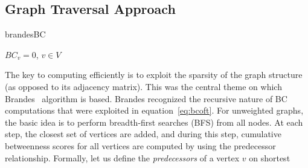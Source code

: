 %
%
\subsection{Graph Traversal Approach}
\label{subsec:graph_traversal}

\begin{algorithm}

\caption{brandesBC}
\label{alg:brandes}
$BC_v = 0$, $v\in{}V$\;

\end{algorithm}
%
The key to computing efficiently is to exploit the sparsity of the graph 
structure (as opposed to its adjacency matrix).
%
This was the central theme on which Brandes~\cite{brandes01:_mathsoc} algorithm
is based.
%
Brandes recognized the recursive nature of BC computations that were exploited
in equation~\ref{eq:bcoft}.
%
For unweighted graphs, the basic idea is to perform breadth-first searches
(BFS) from all nodes.
%
At each step, the closest set of vertices are added, and during this step, 
cumulative betweenness scores for all vertices are computed by using the 
predecessor relationship.
%
Formally, let us define the \textit{predecessors} of a vertex $v$ on shortest
